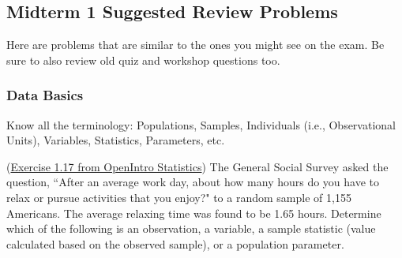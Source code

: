 \documentclass[12pt]{exam}
\newcounter{countA}
\begin{document}
\subsection*{Midterm 1 Suggested Review Problems} 

Here are problems that are similar to the ones you might see on the
exam. Be sure to also review old quiz and workshop questions too.

\subsubsection*{Data Basics}

Know all the terminology: Populations, Samples, Individuals (i.e., Observational Units), Variables, Statistics, Parameters, etc.


\begin{questions}
\setcounter{question}{\value{countA}}
\question (\href{http://people.hsc.edu/faculty-staff/blins/books/OpenIntroStats4e.pdf\#eoce.1.17}{Exercise 1.17 from OpenIntro Statistics}) The General Social Survey asked the question, ``After an average work day,
about how many hours do you have to relax or pursue activities that you enjoy?" to a random sample of 1,155
Americans. The average relaxing time was found to be 1.65 hours. Determine which of the following is an
observation, a variable, a sample statistic (value calculated based on the observed sample), or a population
parameter.
\end{questions}
\end{document}
